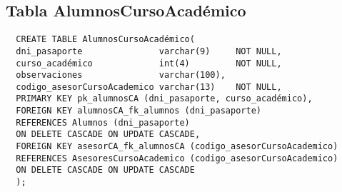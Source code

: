 \subsection{Tabla AlumnosCursoAcadémico}

\begin{verbatim}
  CREATE TABLE AlumnosCursoAcadémico(
  dni_pasaporte               varchar(9)     NOT NULL,
  curso_académico             int(4)         NOT NULL,
  observaciones               varchar(100),
  codigo_asesorCursoAcademico varchar(13)    NOT NULL,
  PRIMARY KEY pk_alumnosCA (dni_pasaporte, curso_académico),
  FOREIGN KEY alumnosCA_fk_alumnos (dni_pasaporte)
  REFERENCES Alumnos (dni_pasaporte)
  ON DELETE CASCADE ON UPDATE CASCADE,
  FOREIGN KEY asesorCA_fk_alumnosCA (codigo_asesorCursoAcademico)
  REFERENCES AsesoresCursoAcademico (codigo_asesorCursoAcademico)
  ON DELETE CASCADE ON UPDATE CASCADE
  );
\end{verbatim}